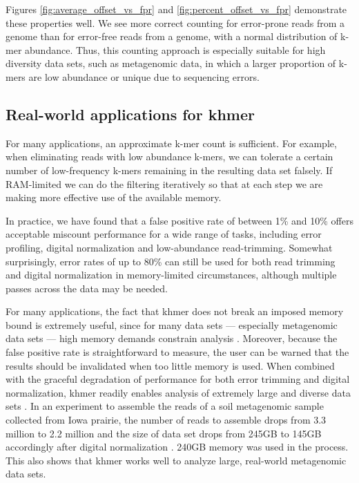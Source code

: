\documentclass[10pt]{article}
\begin{document}
Figures \ref{fig:average_offset_vs_fpr} and
\ref{fig:percent_offset_vs_fpr} demonstrate these properties well.  We
see more correct counting for error-prone reads from a genome than for
error-free reads from a genome, with a normal distribution of k-mer
abundance.  Thus, this counting approach is especially suitable for
high diversity data sets, such as metagenomic data, in which a larger
proportion of k-mers are low abundance or unique due to sequencing
errors.

\subsection*{Real-world applications for khmer}

For many applications, an approximate k-mer count is sufficient.  For
example, when eliminating reads with low abundance k-mers, we can
tolerate a certain number of low-frequency k-mers remaining in the
resulting data set falsely.  If RAM-limited we can do the filtering
iteratively so that at each step we are making more effective use of
the available memory.

In practice, we have found that a false positive rate of between 1\%
and 10\% offers acceptable miscount performance for a wide range of
tasks, including error profiling, digital normalization and
low-abundance read-trimming.  Somewhat surprisingly, error rates of up
to 80\% can still be used for both read trimming and digital
normalization in memory-limited circumstances, although multiple
passes across the data may be needed.

For many applications, the fact that khmer does not break an imposed
memory bound is extremely useful, since for many data sets ---
especially metagenomic data sets --- high memory demands constrain
analysis \cite{Howe2012,Luo2009}.  Moreover, because the false
positive rate is straightforward to measure, the user can be warned
that the results should be invalidated when too little memory is used.
When combined with the graceful degradation of performance for both
error trimming and digital normalization, khmer readily enables
analysis of extremely large and diverse data sets \cite{adina2013}. In
an experiment to assemble the reads of a soil metagenomic sample
collected from Iowa prairie, the number of reads to assemble drops
from 3.3 million to 2.2 million and the size of data set drops from
245GB to 145GB accordingly after digital normalization
\cite{Howe2012}.  240GB memory was used in the process. This also
shows that khmer works well to analyze large, real-world metagenomic data
sets.
\end{document}
